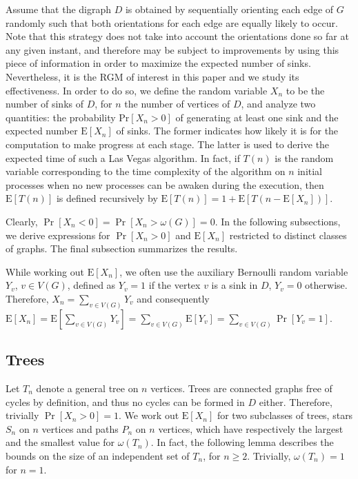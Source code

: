 \documentclass{article}
\begin{document}
Assume that the digraph $D$ is obtained by sequentially orienting each edge of
$G$ randomly such that both orientations for each edge are equally likely to
occur. Note that this strategy does not take into account the orientations done
so far at any given instant, and therefore may be subject to improvements by
using this piece of information in order to maximize the expected number of
sinks. Nevertheless, it is the RGM of interest in this paper and we study its
effectiveness. In order to do so, we define the random variable $X_n$ to be the
number of sinks of $D$, for $n$ the number of vertices of $D$, and analyze two
quantities: the probability $\mathrm{Pr}[X_n > 0]$ of generating at least one
sink and the expected number $\mathrm{E}[X_n]$ of sinks. The former indicates
how likely it is for the computation to make progress at each stage. The latter
is used to derive the expected time of such a Las Vegas algorithm. In fact, if
$T(n)$ is the random variable corresponding to the time complexity of the
algorithm on $n$ initial processes when no new processes can be awaken during
the execution, then $\mathrm{E}[T(n)]$ is defined recursively by
$\mathrm{E}[T(n)] = 1 + \mathrm{E}[T(n - \mathrm{E}[X_n])]$.

Clearly, $\Pr[X_n < 0] = \Pr[X_n > \omega(G)] = 0$. In the following
subsections, we derive expressions for $\Pr[X_n > 0]$ and $\mathrm{E}[X_n]$
restricted to distinct classes of graphs. The final subsection summarizes the
results.

While working out $\mathrm{E}[X_n]$, we often use the auxiliary Bernoulli random
variable $Y_v$, $v \in V(G)$, defined as $Y_v = 1$ if the vertex $v$ is a sink
in $D$, $Y_v = 0$ otherwise. Therefore, $X_n = \sum_{v \in V(G)} Y_v$ and
consequently
$\mathrm{E}[X_n] = \mathrm{E}[\sum_{v \in V(G)} Y_v] = \sum_{v \in V(G)} \mathrm{E}[Y_v] = \sum_{v \in V(G)} \Pr[Y_v = 1]$.

\subsection{Trees}

Let $T_n$ denote a general tree on $n$ vertices. Trees are connected graphs free
of cycles by definition, and thus no cycles can be formed in $D$ either.
Therefore, trivially $\Pr[X_n > 0] = 1$. We work out $\mathrm{E}[X_n]$ for two
subclasses of trees, stars $S_n$ on $n$ vertices and paths $P_n$ on $n$
vertices, which have respectively the largest and the smallest value for
$\omega(T_n)$. In fact, the following lemma describes the bounds on the size of
an independent set of $T_n$, for $n \geq 2$. Trivially, $\omega(T_n) = 1$ for
$n = 1$.
\end{document}
